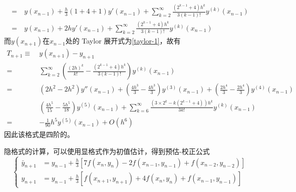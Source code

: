 \documentclass[11pt]{article}
\begin{document}
\begin{question}
{\begin{align*}
            =\            & y(x_{n - 1}) + \frac{h}{3}(1 + 4 + 1)y'(x_{n - 1}) + \sum_{k = 2}^{\infty}\frac{(2^{k - 1} + 4)h^k}{3(k - 1)!}y^{(k)}(x_{n - 1}) \\
            =\            & y(x_{n - 1}) + 2hy'(x_{n - 1}) + \sum_{k = 2}^{\infty}\frac{(2^{k - 1} + 4)h^k}{3(k - 1)!}y^{(k)}(x_{n - 1})
        \end{align*}
        而$y(x_{n + 1})$在$x_{n - 1}$处的 Taylor 展开式为\eqref{taylor-1}，故有
        \begin{align*}
            T_{n + 1} \equiv\  & y(x_{n + 1}) - y_{n + 1}                                                                                                                                                         \\
            =\                 & \sum_{k = 2}^{\infty}\left(\frac{(2h)^k}{k!} - \frac{(2^{k - 1} + 4)h^k}{3(k - 1)!}\right)y^{(k)}(x_{n - 1})                                                                     \\
            =\                 & \left(2h^2 - 2h^2\right)y''(x_{n - 1}) + \left(\frac{4h^3}{3} - \frac{4h^3}{3}\right)y^{(3)}(x_{n - 1}) + \left(\frac{2h^4}{3} - \frac{2h^4}{3}\right)y^{(4)}(x_{n - 1})         \\
                               & \left(\frac{4h^5}{15} - \frac{5h^5}{18}\right)y^{(5)}(x_{n - 1}) + \sum_{k = 6}^{\infty}\frac{\left(3 \times 2^k - k\left(2^{k - 1} + 4\right)\right)h^k}{3k!}y^{(k)}(x_{n - 1}) \\
            =\                 & -\frac{1}{90}h^5y^{(5)}(x_{n - 1}) + O(h^6)
        \end{align*}
        因此该格式是四阶的。

        隐格式的计算，可以使用显格式作为初值估计，得到预估-校正公式
        \begin{equation*}
            \left\{
            \begin{aligned}
                \bar{y}_{n + 1} & = y_{n - 1} + \frac{h}{3}\left[7f(x_{n}, y_{n}) - 2f(x_{n - 1}, y_{n - 1}) + f(x_{n - 2}, y_{n - 2})\right] \\
                y_{n + 1}       & = y_{n - 1} + \frac{h}{3}\left[f(x_{n + 1}, y_{n + 1}) + 4f(x_{n}, y_{n}) + f(x_{n - 1}, y_{n - 1})\right]
            \end{aligned}
            \right.
        \end{equation*}
    }
\end{question}
\end{document}
